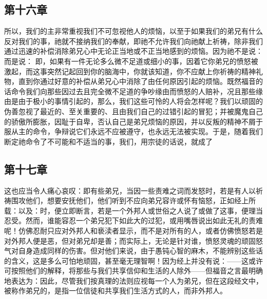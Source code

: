 
\subsection{第十六章}

\par

所以，我们的主非常重视我们不可忽视他人的烦恼，以至于如果我们的弟兄有什么反对我们的事，祂就不接纳我们的奉献，即祂不允许我们向祂献上祈祷，除非我们通过迅速的补偿消除弟兄心中无论正当地或不正当地感到的烦恼。因为祂不是说： 而是说： 即，如果有一件无论多么微不足道或细小的事，因着它你弟兄的愤怒被激起，而这事突然记起回到你的脑海中，你就该知道，你不应献上你祈祷的精神礼物，直到你通过好意的补偿从弟兄心中消除了由任何原因引起的烦恼。既然福音的话命令我们向那些因过去且完全微不足道的争吵缘由而愤怒的人赔补，况且那些缘由是由于极小的事情引起的，那么，我们这些可怜的人将会怎样呢？我们以顽固的伪善忽视了最近的、至关重要的、且由我们自己的过错引起的冒犯；并被魔鬼自己的骄傲所膨胀，因耻于自卑，否认自己是弟兄烦恼的原因，并以反叛的精神不屑于服从主的命令，争辩说它们永远不应被遵守，也永远无法被实现。于是，随着我们断定祂命令了不可能和不适当的事，我们，用宗徒的话说，就成了\par


\subsection{第十七章}

\par

这也应当令人痛心哀叹：即有些弟兄，当因一些责难之词而发怒时，若是有人以祈祷围攻他们，想要安抚他们，他们听到不应向弟兄容许或怀有恼怒，正如经上所载：以及：时，便立即断言，若是一个外邦人或世俗之人说了或做了这事，便理当忍受。然而，谁能容忍一个弟兄犯下如此大的过犯，或用嘴唇说出如此无礼的责难呢！仿佛忍耐只应对外邦人和亵渎者显示，而不是对所有的人，或者仿佛愤怒若是对外邦人便是恶，但对弟兄却是善；而实际上，无论是针对谁，愤怒灵魂的顽固怒气对自身造成同样的伤害。但对他们来说，由于愚钝心智的麻木，不能辨别这些话的含义，这是多么可怕地顽固，甚至毫无理智啊！因为经上并没有说：——这或许可按照他们的解释，将那些与我们共享信仰和生活的人除外——但福音之言最明确地表达为：因此，尽管我们按真理的法则应视每一个人为弟兄，但在这段经文中，被称作弟兄的，是指一位信徒和共享我们生活方式的人，而非外邦人。\par

